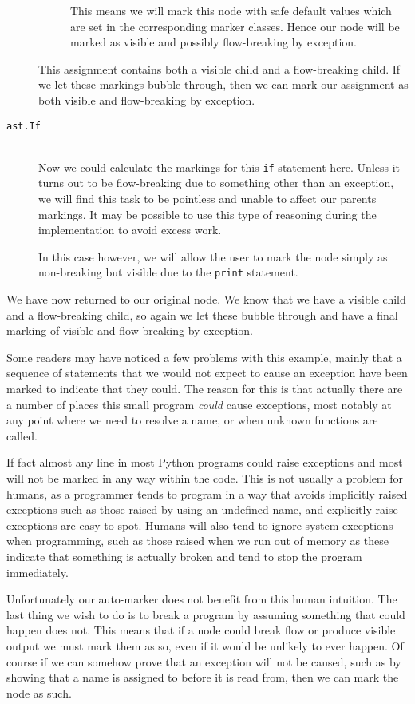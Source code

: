 \documentclass[twoside,a4paper]{report}
\begin{document}
\begin{description}
\begin{description}
    This means we will mark this node with safe default values which are set in the corresponding marker classes. Hence our node will be marked
    as visible and possibly flow-breaking by exception.
  \end{description}
  This assignment contains both a visible child and a flow-breaking child. If we let these markings bubble through, then we can mark our assignment
  as both visible and flow-breaking by exception. 

  \item[\texttt{ast.If}] \hfill \\
  Now we could calculate the markings for this \texttt{if} statement here. Unless it turns out to be flow-breaking due to something other than an
  exception, we will find this task to be pointless and unable to affect our parents markings. It may be possible to use this type of reasoning
  during the implementation to avoid excess work.

  In this case however, we will allow the user to mark the node simply as non-breaking but visible due to the \texttt{print} statement.
\end{description}

We have now returned to our original node. We know that we have a visible child and a flow-breaking child, so again we let these bubble through
and have a final marking of visible and flow-breaking by exception.

Some readers may have noticed a few problems with this example, mainly that a sequence of statements that we would not expect to cause an exception
have been marked to indicate that they could. The reason for this is that actually there are a number of places this small program \textit{could} cause
exceptions, most notably at any point where we need to resolve a name, or when unknown functions are called.

If fact almost any line in most Python programs could raise exceptions and most will not be marked in any way within the code. This is not usually a
problem for humans, as a programmer tends to program in a way that avoids implicitly raised exceptions such as those raised by using an undefined name,
and explicitly raise exceptions are easy to spot. Humans will also tend to ignore system exceptions when programming, such as those raised when we run
out of memory as these indicate that something is actually broken and tend to stop the program immediately.

Unfortunately our auto-marker does not benefit from this human intuition. The last thing we wish to do is to break a program by assuming something that
could happen does not. This means that if a node could break flow or produce visible output we must mark them as so, even if it would be unlikely to ever
happen. Of course if we can somehow prove that an exception will not be caused, such as by showing that a name is assigned to before it is read from,
then we can mark the node as such.
\end{document}
